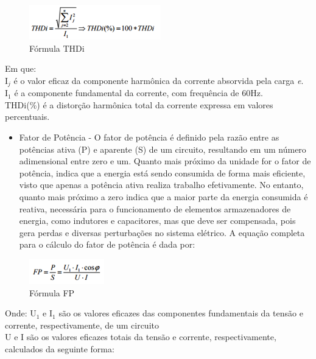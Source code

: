 \begin{figure}[H]
	 \centering
	\label{FormulaTHDI}
	 \includegraphics[keepaspectratio=true,scale=0.8]{figuras/FormulaTHDI.png}
	 \caption{F\'ormula THDi}
\end{figure}

Em que: \\ I$_{j}$ \'e o valor eficaz da componente harm\^onica da corrente absorvida pela carga \textit{e}. \\ I$_{1}$ \'e a componente fundamental da corrente, com frequ\^encia de 60Hz. \\ THDi(\%) \'e a distor\c{c}\~ao harm\^onica total da corrente expressa em valores percentuais.

\begin{itemize}
        \item Fator de Pot\^encia - O fator de pot\^encia \'e definido pela raz\~ao entre as pot\^encias ativa (P) e aparente (S) de um circuito, resultando em um n\'umero adimensional entre zero e um. Quanto mais pr\'oximo da unidade for o fator de pot\^encia, indica que a energia est\'a sendo consumida de forma mais eficiente, visto que apenas a pot\^encia ativa realiza trabalho efetivamente. No entanto, quanto mais pr\'oximo a zero indica que a maior parte da energia consumida \'e reativa, necess\'aria para o funcionamento de elementos armazenadores de energia, como indutores e capacitores, mas que deve ser compensada, pois gera perdas e diversas perturba\c{c}\~oes no sistema el\'etrico. A equa\c{c}\~ao completa para o c\'alculo do fator de pot\^encia \'e dada por:
\end{itemize}

\begin{figure}[H]
	 \centering
	\label{FormulaFP}
	 \includegraphics[keepaspectratio=true,scale=0.8]{figuras/FormulaFP.png}
	 \caption{F\'ormula FP}
\end{figure}

Onde: U$_{1}$ e I$_{1}$ s\~ao os valores eficazes das componentes fundamentais da tens\~ao e corrente, respectivamente, de um circuito \\
U e I s\~ao os valores eficazes totais da tens\~ao e corrente, respectivamente, calculados da seguinte forma:


